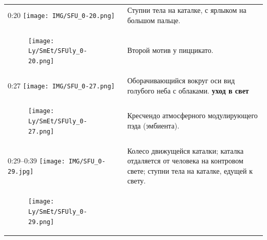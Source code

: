 \begin{longtable}[]{@{}ll@{}}
\begin{minipage}[t]{0.32\columnwidth}
0:20
\texttt{[image: IMG/SFU\_0-20.png]}\strut
\end{minipage} & \begin{minipage}[t]{0.62\columnwidth}\raggedright\strut
Ступни тела на каталке, с ярлыком
на большом пальце.\strut
\end{minipage}\tabularnewline
\begin{minipage}[t]{0.32\columnwidth}\raggedright\strut
\begin{figure}
\centering
\texttt{[image: Ly/SmEt/SFUly\_0-20.png]}
\caption{}
\end{figure}
\strut
\end{minipage} & \begin{minipage}[t]{0.62\columnwidth}\raggedright\strut
Второй мотив у пиццикато.\strut
\end{minipage}\tabularnewline
\begin{minipage}[t]{0.32\columnwidth}\raggedright\strut
0:27
\texttt{[image: IMG/SFU\_0-27.png]}\strut
\end{minipage} & \begin{minipage}[t]{0.62\columnwidth}\raggedright\strut
Оборачивающийся вокруг оси вид
голубого неба с облаками.
\textbf{уход в свет}\strut
\end{minipage}\tabularnewline
\begin{minipage}[t]{0.32\columnwidth}\raggedright\strut
\begin{figure}
\centering
\texttt{[image: Ly/SmEt/SFUly\_0-27.png]}
\caption{}
\end{figure}
\strut
\end{minipage} & \begin{minipage}[t]{0.62\columnwidth}\raggedright\strut
Кресчендо атмосферного модулирующего пэда (эмбиента).\strut
\end{minipage}\tabularnewline
\begin{minipage}[t]{0.32\columnwidth}\raggedright\strut
0:29--0:39
\texttt{[image: IMG/SFU\_0-29.jpg]}\strut
\end{minipage} & \begin{minipage}[t]{0.62\columnwidth}\raggedright\strut
Колесо движущейся каталки; каталка
отдаляется от человека на контровом свете;
ступни тела на каталке, едущей к свету.\strut
\end{minipage}\tabularnewline
\begin{minipage}[t]{0.32\columnwidth}\raggedright\strut
\begin{figure}
\centering
\texttt{[image: Ly/SmEt/SFUly\_0-29.png]}
\caption{}
\end{figure}

\end{minipage}
\end{longtable}
